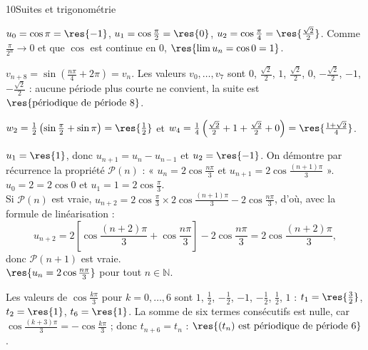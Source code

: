 \begin{corrige}{10}{Suites et trigonométrie}
\begin{questions}
  \item $u_0=\cos\pi=\res{-1}$, $u_1=\cos\frac{\pi}{2}=\res{0}$, $u_2=\cos\frac{\pi}{4}=\res{\frac{\sqrt2}{2}}$. Comme $\frac{\pi}{2^{n}}\to0$ et que
    $\cos$ est continue en $0$, $\res{\lim u_n=\cos0=1}$.
  \item $v_{n+8}=\sin\left(\frac{n\pi}{4}+2\pi\right)=v_n$. Les valeurs $v_0,\dots,v_7$ sont $0$, $\frac{\sqrt2}{2}$, $1$, $\frac{\sqrt2}{2}$, $0$,
    $-\frac{\sqrt2}{2}$, $-1$, $-\frac{\sqrt2}{2}$ : aucune période plus courte ne convient, la suite est $\res{\text{périodique de période }8}$.
  \item $w_2=\frac12\left(\sin\frac{\pi}{2}+\sin\pi\right)=\res{\frac12}$ et $w_4=\frac14\left(\frac{\sqrt2}{2}+1+\frac{\sqrt2}{2}+0\right)=\res{\frac{1+\sqrt2}{4}}$.
  \item $u_1=\res{1}$, donc $u_{n+1}=u_n-u_{n-1}$ et $u_2=\res{-1}$. On démontre par récurrence la propriété
    $\mathcal{P}(n)$ : « $u_n=2\cos\frac{n\pi}{3}$ et $u_{n+1}=2\cos\frac{(n+1)\pi}{3}$ ».\\
     $u_0=2=2\cos0$ et $u_1=1=2\cos\frac{\pi}{3}$.\\
     Si $\mathcal{P}(n)$ est vraie, $u_{n+2}=2\cos\frac{\pi}{3}\times2\cos\frac{(n+1)\pi}{3}-2\cos\frac{n\pi}{3}$, d'où,
    avec la formule de linéarisation :
    \[ u_{n+2}=2\left[\cos\frac{(n+2)\pi}{3}+\cos\frac{n\pi}{3}\right]-2\cos\frac{n\pi}{3}=2\cos\frac{(n+2)\pi}{3}, \]
    donc $\mathcal{P}(n+1)$ est vraie.\\
     $\res{u_n=2\cos\frac{n\pi}{3}}$ pour tout $n\in\mathbb{N}$.
  \item Les valeurs de $\cos\frac{k\pi}{3}$ pour $k=0,\dots,6$ sont $1$, $\frac12$, $-\frac12$, $-1$, $-\frac12$, $\frac12$, $1$ :
    $t_1=\res{\frac32}$, $t_2=\res{1}$, $t_6=\res{1}$. La somme de six termes consécutifs est nulle, car
    $\cos\frac{(k+3)\pi}{3}=-\cos\frac{k\pi}{3}$ ; donc $t_{n+6}=t_n$ : $\res{(t_n)\text{ est périodique de période }6}$.
\end{questions}
\end{corrige}

